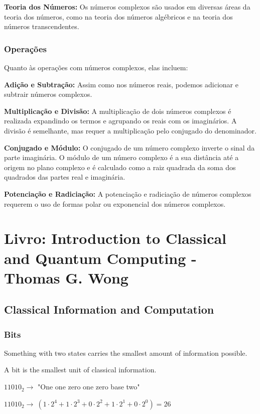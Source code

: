 \documentclass[12pt]{article}
\begin{document}
\textbf{Teoria dos Números:} Os números complexos são usados em diversas áreas da teoria dos números, como na teoria dos números algébricos e na teoria dos números transcendentes.

\subsubsection{Operações}

Quanto às operações com números complexos, elas incluem:

\textbf{Adição e Subtração:} Assim como nos números reais, podemos adicionar e subtrair números complexos.

\textbf{Multiplicação e Divisão:} A multiplicação de dois números complexos é realizada expandindo os termos e agrupando os reais com os imaginários. A divisão é semelhante, mas requer a multiplicação pelo conjugado do denominador.

\textbf{Conjugado e Módulo:} O conjugado de um número complexo inverte o sinal da parte imaginária. O módulo de um número complexo é a sua distância até a origem no plano complexo e é calculado como a raiz quadrada da soma dos quadrados das partes real e imaginária.

\textbf{Potenciação e Radiciação:} A potenciação e radiciação de números complexos requerem o uso de formas polar ou exponencial dos números complexos.

\newpage
\section{Livro: Introduction to Classical and Quantum Computing - Thomas G. Wong}

\subsection{Classical Information and Computation}

\subsubsection{Bits}

Something with two states carries the smallest amount of information possible.

A bit is the smallest unit of classical information.

\(11010_{2} \rightarrow\) "One one zero one zero base two"

\(11010_{2} \rightarrow\ (1 \cdot 2^{4}+1 \cdot 2^{3}+0 \cdot 2^{2}+1 \cdot 2^{1}+0 \cdot 2^0) = 26\)
\end{document}
